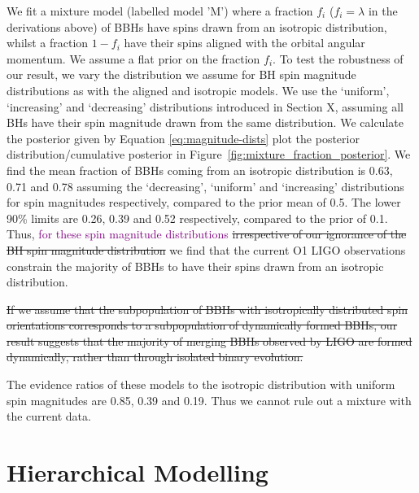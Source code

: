 \documentclass[modern,linenumbers]{aastex61}
\newcommand{\ilya}[1]{\textcolor{purple}{#1}}
\begin{document}
We fit a mixture model (labelled model 'M') where a fraction $f_i$ ($f_i=\lambda$ in the derivations above) of BBHs have spins drawn from an isotropic distribution, whilst a fraction $1 - f_i$ have their spins aligned with the orbital angular momentum. We assume a flat prior on the fraction $f_i$. To test the robustness of our result, we vary the distribution we assume for BH spin magnitude distributions as with the aligned and isotropic models. We use the `uniform', `increasing' and `decreasing' distributions introduced in Section X, assuming all BHs have their spin magnitude drawn from the same distribution. We calculate the posterior given by Equation \ref{eq:magnitude-dists} plot the posterior distribution/cumulative posterior in Figure~\ref{fig:mixture_fraction_posterior}. We find the mean fraction of BBHs coming from an isotropic distribution is 0.63, 0.71 and 0.78 assuming the `decreasing', `uniform' and `increasing' distributions for spin magnitudes respectively, compared to the prior mean of 0.5. The lower 90\% limits are 0.26, 0.39 and 0.52 respectively, compared to the prior of 0.1.
Thus, \ilya{for these spin magnitude distributions} 
\sout{irrespective of our ignorance of the BH spin magnitude distribution}
we find that the current O1 LIGO observations constrain the majority of BBHs to have their spins drawn from an isotropic distribution. 

\sout{If we assume that the subpopulation of BBHs with isotropically distributed spin orientations corresponds to a subpopulation of dynamically formed BBHs, our result suggests that the majority of merging BBHs observed by LIGO are formed dynamically, rather than through isolated binary evolution.}

The evidence ratios of these models to the isotropic distribution with uniform spin magnitudes are 0.85, 0.39 and 0.19. Thus we cannot rule out a mixture with the current data. 


\section{Hierarchical Modelling} 
\label{sec:hierarchical}
\end{document}
